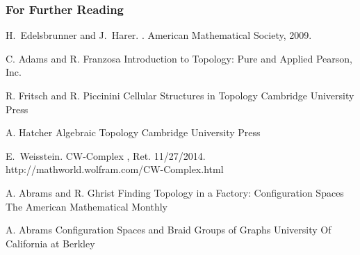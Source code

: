 \documentclass{beamer}
\begin{document}
\begin{frame}[allowframebreaks]
  \frametitle<presentation>{For Further Reading}
    
  \begin{thebibliography}{10}
    
  \beamertemplatebookbibitems
  
    
    H.~Edelsbrunner and J.~Harer.
    .
    \newblock American Mathematical Society, 2009.
    
  
    
        C. Adams and R. Franzosa
        \newblock Introduction to Topology: Pure and Applied
        \newblock Pearson, Inc.
    
        R. Fritsch and R. Piccinini
        \newblock Cellular Structures in Topology
        \newblock Cambridge University Press
    
        A. Hatcher
        \newblock Algebraic Topology
        \newblock Cambridge University Press
    
  \beamertemplatearticlebibitems
  
    E.~Weisstein.
    \newblock CW-Complex
    , Ret.           11/27/2014.
    \newblock http://mathworld.wolfram.com/CW-Complex.html
    
        A. Abrams and R. Ghrist
        \newblock Finding Topology in a Factory: Configuration             Spaces
        \newblock The American Mathematical Monthly
    
        A. Abrams
        \newblock Configuration Spaces and Braid Groups of Graphs
        \newblock University Of California at Berkley



  \end{thebibliography}
\end{frame}
\end{document}
